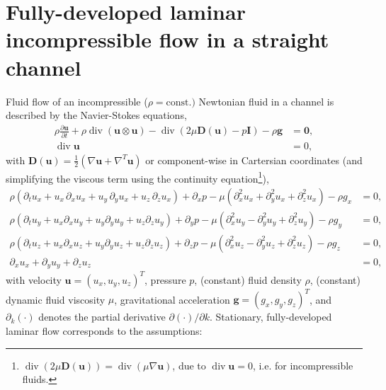 \documentclass{article}
\begin{document}
\section{Fully-developed laminar incompressible flow in a straight channel}
Fluid flow of an incompressible ($\rho = \text{const.})$ Newtonian fluid in a channel is described by the Navier-Stokes equations,
\begin{subequations}
\begin{align}
\rho\frac{\partial \boldsymbol{u}}{\partial t} + \rho\operatorname{div}(\boldsymbol{u} \otimes\boldsymbol{u}) - \operatorname{div}(2\mu \boldsymbol{D}(\boldsymbol{u}) - p\boldsymbol{I}) - \rho \boldsymbol{g} &= \boldsymbol{0}, \\
\operatorname{div}\boldsymbol{u} &= 0,
\end{align}
\end{subequations}
with $\boldsymbol{D}(\boldsymbol{u}) = \frac{1}{2}\left( \nabla \boldsymbol{u} + \nabla^T \boldsymbol{u} \right)$ or component-wise in Cartersian coordinates (and simplifying the viscous term using the continuity equation\footnote{$\operatorname{div}(2\mu \boldsymbol{D}(\boldsymbol{u})) = \operatorname{div}(\mu \nabla\boldsymbol{u})$, due to $\operatorname{div}\boldsymbol{u} = 0$, i.e. for incompressible fluids.}),
\begin{subequations}
\begin{align}
\rho \left({\partial_t u_x} + u_x \, {\partial_x u_x} + u_y \, {\partial_y u_x} + u_z \, {\partial_z u_x}\right) + \partial_x p - \mu \left({\partial_x^2 u_x} + {\partial_y^2 u_x} + {\partial_z^2 u_x}\right) - \rho g_x &= 0, \\
\rho \left({\partial_t u_y} + u_x {\partial_x u_y} + u_y {\partial_y u_y} + u_z {\partial_z u_y}\right) + {\partial_y p} - \mu \left({\partial_x^2 u_y} - {\partial_y^2 u_y} + {\partial_z^2 u_y}\right) - \rho g_y &= 0, \\
\rho \left({\partial_t u_z} + u_x {\partial_x u_z} + u_y {\partial_y u_z} + u_z {\partial_z u_z}\right) + {\partial_z p} - \mu \left({\partial_x^2 u_z} - {\partial_y^2 u_z} + {\partial_z^2 u_z}\right) - \rho g_z &= 0, \\
\partial_x u_x + \partial_y u_y + \partial_z u_z &= 0, \label{eq:mass}
\end{align}
\label{eq:ns}
\end{subequations}
with velocity $\boldsymbol{u} = (u_x, u_y, u_z)^T$, pressure $p$, (constant) fluid density $\rho$, (constant) dynamic fluid viscosity $\mu$, gravitational acceleration $\boldsymbol{g} = (g_x, g_y, g_z)^T$, and $\partial_k(\cdot)$ denotes the partial derivative $\partial (\cdot)/\partial k$. Stationary, fully-developed laminar flow corresponds to the assumptions:
\end{document}
